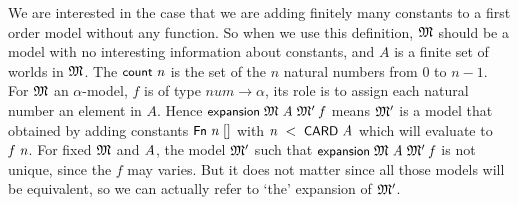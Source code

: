 \documentclass[letterpaper]{article}
\renewcommand{\HOLConst}[1]{{\textsf{\upshape\small #1}}}
\renewcommand{\HOLinline}[1]{\ensuremath{#1}}
\begin{document}
We are interested in the case that we are adding finitely many constants to a first order model without any function. So when we use this definition, \HOLinline{\HOLFreeVar{\ensuremath{\mathfrak{M}}}} should be a model with no interesting information about constants, and $A$ is a finite set of worlds in \HOLinline{\HOLFreeVar{\ensuremath{\mathfrak{M}}}}. The \HOLinline{\HOLConst{count}\;\HOLFreeVar{n}} is the set of the $n$ natural numbers from $0$ to $n-1$. For \HOLinline{\HOLFreeVar{\ensuremath{\mathfrak{M}}}} an $\alpha$-model, $f$ is of type $num\to \alpha$, its role is to assign each natural number an element in $A$. Hence \HOLinline{\HOLConst{expansion}\;\HOLFreeVar{\ensuremath{\mathfrak{M}}}\;\HOLFreeVar{A}\;\HOLFreeVar{\ensuremath{\mathfrak{M}'}}\;\HOLFreeVar{f}} means \HOLinline{\HOLFreeVar{\ensuremath{\mathfrak{M}'}}} is a model that obtained by adding constants \HOLinline{\HOLConst{Fn}\;\HOLFreeVar{n}\;[]} with \HOLinline{\HOLFreeVar{n}\;\HOLSymConst{\HOLTokenLt{}}\;\HOLConst{CARD}\;\HOLFreeVar{A}} which will evaluate to \HOLinline{\HOLFreeVar{f}\;\HOLFreeVar{n}}. For fixed \HOLinline{\HOLFreeVar{\ensuremath{\mathfrak{M}}}} and \HOLinline{\HOLFreeVar{A}}, the model \HOLinline{\HOLFreeVar{\ensuremath{\mathfrak{M}'}}} such that \HOLinline{\HOLConst{expansion}\;\HOLFreeVar{\ensuremath{\mathfrak{M}}}\;\HOLFreeVar{A}\;\HOLFreeVar{\ensuremath{\mathfrak{M}'}}\;\HOLFreeVar{f}} is not unique, since the $f$ may varies. But it does not matter since all those models will be equivalent, so we can actually refer to `the' expansion of \HOLinline{\HOLFreeVar{\ensuremath{\mathfrak{M}'}}}. %
\end{document}
